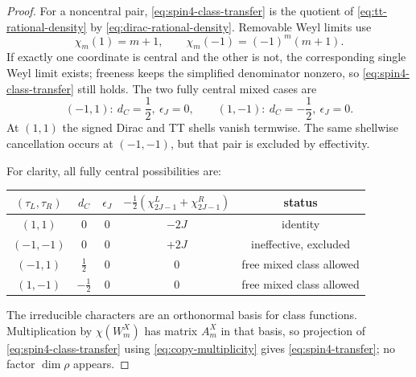 \documentclass[11pt]{article}
\theoremstyle{definition}
\begin{document}
\begin{proof}
For a noncentral pair,
\eqref{eq:spin4-class-transfer} is the quotient of
\eqref{eq:tt-rational-density} by
\eqref{eq:dirac-rational-density}.  Removable Weyl limits use
\begin{equation}
 \chi_m(1)=m+1,
 \qquad
\chi_m(-1)=(-1)^m(m+1).
\label{eq:weyl-central-values}
\end{equation}
If exactly one coordinate is central and the other is not, the corresponding
single Weyl limit exists; freeness keeps the simplified denominator nonzero,
so \eqref{eq:spin4-class-transfer} still holds.  The two fully central mixed
cases are
\begin{equation}
 (-1,1):\ d_C=\frac12,\ \epsilon_J=0,
 \qquad
 (1,-1):\ d_C=-\frac12,\ \epsilon_J=0.
 \label{eq:mixed-central-values}
\end{equation}
At $(1,1)$ the signed Dirac and TT shells vanish termwise.  The same
shellwise cancellation occurs at $(-1,-1)$, but that pair is excluded by
effectivity.

For clarity, all fully central possibilities are:
\begin{center}
\begin{tabular}{@{}ccccc@{}}
\toprule
$(\tau_L,\tau_R)$ & $d_C$ & $\epsilon_J$ &
$-\tfrac12(\chi_{2J-1}^L+\chi_{2J-1}^R)$ & status\\
\midrule
$(1,1)$ & $0$ & $0$ & $-2J$ & identity\\
$(-1,-1)$ & $0$ & $0$ & $+2J$ & ineffective, excluded\\
$(-1,1)$ & $\tfrac12$ & $0$ & $0$ & free mixed class allowed\\
$(1,-1)$ & $-\tfrac12$ & $0$ & $0$ & free mixed class allowed\\
\bottomrule
\end{tabular}
\end{center}

The irreducible characters are an orthonormal basis for class functions.
Multiplication by $\chi(W_m^X)$ has matrix $A_m^X$ in that basis, so projection
of \eqref{eq:spin4-class-transfer} using
\eqref{eq:copy-multiplicity} gives \eqref{eq:spin4-transfer}; no factor
$\dim\rho$ appears.
\end{proof}
\end{document}
